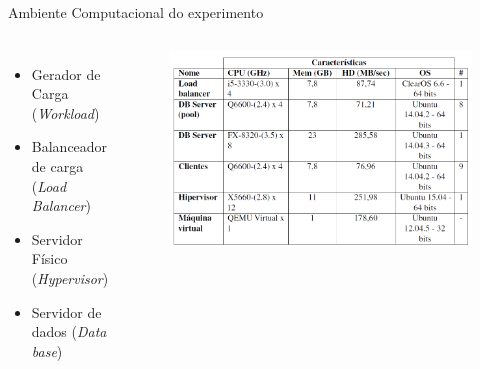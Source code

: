 \begin{frame}{Ambiente Computacional do experimento}
\begin{columns}
		\begin{minipage}[c][0.4\textheight][c]{\linewidth}
			\begin{itemize}
				\item Gerador de Carga (\textit{Workload})
				\item Balanceador de carga (\textit{Load Balancer})
				\item Servidor Físico (\textit{Hypervisor})
				\item Servidor de dados (\textit{Data base})
			\end{itemize}
			\begin{figure}
				\centering
				\includegraphics[scale=0.25]{images/soft-hard.png}
			\end{figure}
		\end{minipage}		
	\end{columns}
	
\end{frame}


